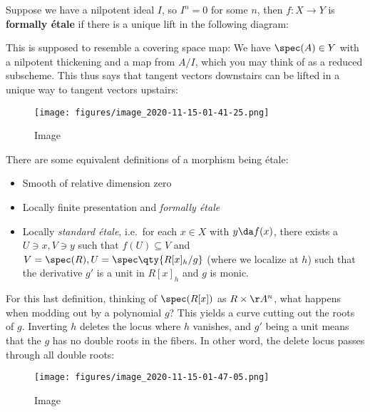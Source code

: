 \begin{definition}

Suppose we have a nilpotent ideal \(I\), so \(I^n = 0\) for some \(n\),
then \(f:X\to Y\) is \textbf{formally étale} if there is a unique lift
in the following diagram:

\begin{center}
\end{center}

\end{definition}

\begin{remark}

This is supposed to resemble a covering space map: We have
\(\spec(A) \in Y\) with a nilpotent thickening and a map from \(A/I\),
which you may think of as a reduced subscheme. This thus says that
tangent vectors downstairs can be lifted in a unique way to tangent
vectors upstairs:

\begin{figure}
\centering
\texttt{[image: figures/image\_2020-11-15-01-41-25.png]}
\caption{Image}
\end{figure}

\end{remark}

\begin{remark}

There are some equivalent definitions of a morphism being étale:

\begin{itemize}
\item
  Smooth of relative dimension zero
\item
  Locally finite presentation and \emph{formally étale}
\item
  Locally \emph{standard étale}, i.e.~for each \(x\in X\) with
  \(y\da f(x)\), there exists a \(U\ni x, V\ni y\) such that
  \(f(U) \subseteq V\) and \(V=\spec(R), U = \spec\qty{R[x]_h / g}\)
  (where we localize at \(h\)) such that the derivative \(g'\) is a unit
  in \(R[x]_h\) and \(g\) is monic.
\end{itemize}

For this last definition, thinking of \(\spec(R[x])\) as
\(R\times \AA^n\), what happens when modding out by a polynomial \(g\)?
This yields a curve cutting out the roots of \(g\). Inverting \(h\)
deletes the locus where \(h\) vanishes, and \(g'\) being a unit means
that the \(g\) has no double roots in the fibers. In other word, the
delete locus passes through all double roots:

\begin{figure}
\centering
\texttt{[image: figures/image\_2020-11-15-01-47-05.png]}
\caption{Image}
\end{figure}

\end{remark}

